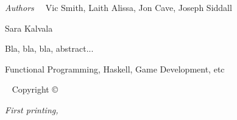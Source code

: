 

\frontmatter

%


\maketitle


\newpage
\begin{fullwidth}
	{\large {\it Authors\ \ } Vic Smith, Laith Alissa, Jon Cave, Joseph Siddall
	
	\vspace{1em} Sara Kalvala
	
	\vspace{1em} Bla, bla, bla, abstract...
	
	\vspace{1em} Functional Programming, Haskell, Game Development, etc
	
	}
	
	~\vfill
	\thispagestyle{empty}
	\setlength{\parindent}{0pt}
	\setlength{\parskip}{\baselineskip}
	Copyright \copyright\ \the\year\ \plainauthor
	
	\par{}
	
	
	\par\textit{First printing, \monthyear}

	\newpage

\end{fullwidth}

